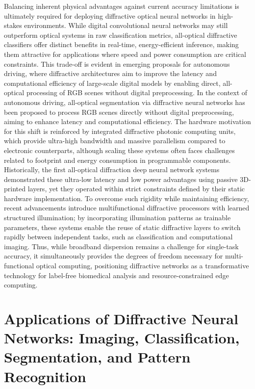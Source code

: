 \documentclass[11pt]{article}
\begin{document}
Balancing inherent physical advantages against current accuracy limitations is ultimately required for deploying diffractive optical neural networks in high-stakes environments. While digital convolutional neural networks may still outperform optical systems in raw classification metrics, all-optical diffractive classifiers offer distinct benefits in real-time, energy-efficient inference, making them attractive for applications where speed and power consumption are critical constraints. This trade-off is evident in emerging proposals for autonomous driving, where diffractive architectures aim to improve the latency and computational efficiency of large-scale digital models by enabling direct, all-optical processing of RGB scenes without digital preprocessing. In the context of autonomous driving, all-optical segmentation via diffractive neural networks has been proposed to process RGB scenes directly without digital preprocessing, aiming to enhance latency and computational efficiency. \citep{doi_10_48550_arxiv_2602_07717_16cb1c7a} The hardware motivation for this shift is reinforced by integrated diffractive photonic computing units, which provide ultra-high bandwidth and massive parallelism compared to electronic counterparts, although scaling these systems often faces challenges related to footprint and energy consumption in programmable components. Historically, the first all-optical diffraction deep neural network systems demonstrated these ultra-low latency and low power advantages using passive 3D-printed layers, yet they operated within strict constraints defined by their static hardware implementation. To overcome such rigidity while maintaining efficiency, recent advancements introduce multifunctional diffractive processors with learned structured illumination; by incorporating illumination patterns as trainable parameters, these systems enable the reuse of static diffractive layers to switch rapidly between independent tasks, such as classification and computational imaging. Thus, while broadband dispersion remains a challenge for single-task accuracy, it simultaneously provides the degrees of freedom necessary for multi-functional optical computing, positioning diffractive networks as a transformative technology for label-free biomedical analysis and resource-constrained edge computing. \citep{doi_10_1364_ol_593231_ab93febc} \citep{doi_10_48550_arxiv_2602_07717_16cb1c7a} \citep{doi_10_1038_s41467_022_28702_0_1b79b43c} \citep{doi_10_1364_josab_497148_b087424b} \citep{doi_10_1364_ol_591818_8738c4b1}

\section{Applications of Diffractive Neural Networks: Imaging, Classification, Segmentation, and Pattern Recognition}\label{applications-of-diffractive-neural-networks-imaging-classification-segmentation-and-pattern-recognition}
\end{document}
